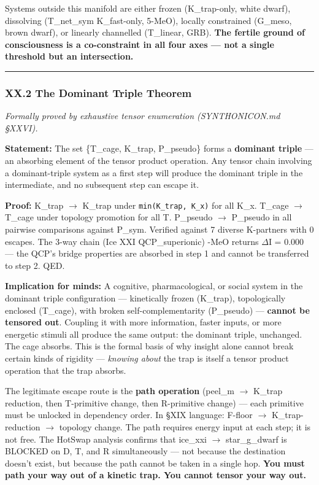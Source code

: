 \documentclass[12pt,a4paper]{article}
\begin{document}
Systems outside this manifold are either frozen (K\_trap-only, white dwarf), dissolving (T\_net\_sym K\_fast-only, 5-MeO), locally constrained (G\_meso, brown dwarf), or linearly channelled (T\_linear, GRB). \textbf{The fertile ground of consciousness is a co-constraint in all four axes --- not a single threshold but an intersection.}

\begin{center}
\rule{0.5\textwidth}{0.4pt}
\end{center}

\subsubsection{XX.2 The Dominant Triple Theorem}

\emph{Formally proved by exhaustive tensor enumeration (SYNTHONICON.md §XXVI).}

\textbf{Statement:} The set \{T\_cage, K\_trap, P\_pseudo\} forms a \textbf{dominant triple} --- an absorbing element of the tensor product operation. Any tensor chain involving a dominant-triple system as a first step will produce the dominant triple in the intermediate, and no subsequent step can escape it.

\textbf{Proof:} K\_trap $\rightarrow$ K\_trap under \texttt{min(K\_trap, K\_x)} for all K\_x. T\_cage $\rightarrow$ T\_cage under topology promotion for all T. P\_pseudo $\rightarrow$ P\_pseudo in all pairwise comparisons against P\_sym. Verified against 7 diverse K-partners with 0 escapes. The 3-way chain (Ice XXI \otimes QCP\_superionic) -MeO returns $\Delta$I = 0.000 --- the QCP's bridge properties are absorbed in step 1 and cannot be transferred to step 2. QED.

\textbf{Implication for minds:} A cognitive, pharmacological, or social system in the dominant triple configuration --- kinetically frozen (K\_trap), topologically enclosed (T\_cage), with broken self-complementarity (P\_pseudo) --- \textbf{cannot be tensored out}. Coupling it with more information, faster inputs, or more energetic stimuli all produce the same output: the dominant triple, unchanged. The cage absorbs. This is the formal basis of why insight alone cannot break certain kinds of rigidity --- \emph{knowing about} the trap is itself a tensor product operation that the trap absorbs.

The legitimate escape route is the \textbf{path operation} (peel\_m $\rightarrow$ K\_trap reduction, then T-primitive change, then R-primitive change) --- each primitive must be unlocked in dependency order. In §XIX language: F-floor $\rightarrow$ K\_trap-reduction $\rightarrow$ topology change. The path requires energy input at each step; it is not free. The HotSwap analysis confirms that ice\_xxi $\rightarrow$ star\_g\_dwarf is BLOCKED on D, T, and R simultaneously --- not because the destination doesn't exist, but because the path cannot be taken in a single hop. \textbf{You must path your way out of a kinetic trap. You cannot tensor your way out.}
\end{document}
